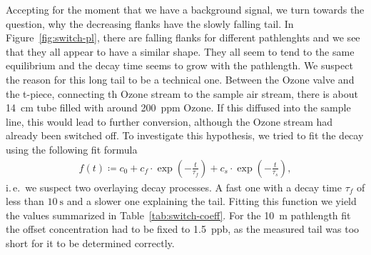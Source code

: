 Accepting for the moment that we have a background  signal, we
turn towards the question, why the decreasing flanks have the slowly
falling tail. In Figure~\ref{fig:switch-pl}, there are falling flanks for
different pathlenghts and we see that they all appear to have a
similar shape. They all seem to tend to the same equilibrium and the
decay time seems to grow with the pathlength. We suspect the reason
for this long tail to be a technical one. Between the Ozone valve and
the t-piece, connecting th Ozone stream to the sample air stream,
there is about \SI{14}{\centi\meter} tube filled with around
\SI{200}{ppm} Ozone. If this diffused into the sample line, this would
lead to further  conversion, although the Ozone stream had 
already been switched off. To investigate this hypothesis, we tried to fit
the decay using the following fit formula
\begin{align}
  f(t) \coloneqq c_0 + c_f \cdot\exp\left( -\frac{t}{\tau_f}\right) +
  c_s \cdot \exp\left(-\frac{t}{\tau_s}\right), \label{eq:switch-fit}
\end{align}
i.\,e.\ we suspect two overlaying decay processes. A fast one with a
decay time $\tau_f$ of less than $\SI{10}{\second}$ and a slower one
explaining the tail. Fitting this function we yield the values
summarized in Table~\ref{tab:switch-coeff}. For the \SI{10}{\meter}
pathlength fit the offset concentration had to be fixed to
\SI{1.5}{ppb}, as the measured tail was too short for it to be
determined correctly.

